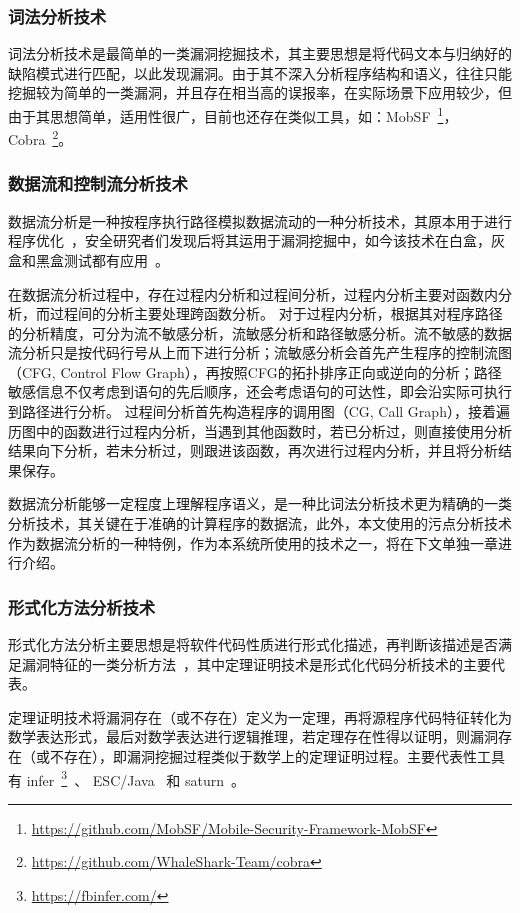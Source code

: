 \subsubsection{词法分析技术}
词法分析技术是最简单的一类漏洞挖掘技术，其主要思想是将代码文本与归纳好的缺陷模式进行匹配，以此发现漏洞。由于其不深入分析程序结构和语义，往往只能挖掘较为简单的一类漏洞，并且存在相当高的误报率，在实际场景下应用较少，但由于其思想简单，适用性很广，目前也还存在类似工具，如：MobSF~\footnote{\url{https://github.com/MobSF/Mobile-Security-Framework-MobSF}}，Cobra~\footnote{\url{https://github.com/WhaleShark-Team/cobra}}。

\subsubsection{数据流和控制流分析技术}
数据流分析是一种按程序执行路径模拟数据流动的一种分析技术，其原本用于进行程序优化~\cite{Kildall1973}，安全研究者们发现后将其运用于漏洞挖掘中，如今该技术在白盒，灰盒和黑盒测试都有应用~\cite{Shastry2016}。

在数据流分析过程中，存在过程内分析和过程间分析，过程内分析主要对函数内分析，而过程间的分析主要处理跨函数分析。
对于过程内分析，根据其对程序路径的分析精度，可分为流不敏感分析，流敏感分析和路径敏感分析。流不敏感的数据流分析只是按代码行号从上而下进行分析；流敏感分析会首先产生程序的控制流图（CFG, Control Flow Graph），再按照CFG的拓扑排序正向或逆向的分析；路径敏感信息不仅考虑到语句的先后顺序，还会考虑语句的可达性，即会沿实际可执行到路径进行分析。
过程间分析首先构造程序的调用图（CG, Call Graph），接着遍历图中的函数进行过程内分析，当遇到其他函数时，若已分析过，则直接使用分析结果向下分析，若未分析过，则跟进该函数，再次进行过程内分析，并且将分析结果保存。

数据流分析能够一定程度上理解程序语义，是一种比词法分析技术更为精确的一类分析技术，其关键在于准确的计算程序的数据流，此外，本文使用的污点分析技术作为数据流分析的一种特例，作为本系统所使用的技术之一，将在下文单独一章进行介绍。

\subsubsection{形式化方法分析技术}
形式化方法分析主要思想是将软件代码性质进行形式化描述，再判断该描述是否满足漏洞特征的一类分析方法~\cite{B:automatedTheoremProving}，其中定理证明技术是形式化代码分析技术的主要代表。

定理证明技术将漏洞存在（或不存在）定义为一定理，再将源程序代码特征转化为数学表达形式，最后对数学表达进行逻辑推理，若定理存在性得以证明，则漏洞存在（或不存在），即漏洞挖掘过程类似于数学上的定理证明过程。主要代表性工具有 infer~\footnote{\url{https://fbinfer.com/}}~\cite{atp:infer}、 ESC/Java~\cite{atp:escjava} 和 saturn~\cite{atp:saturn}。

